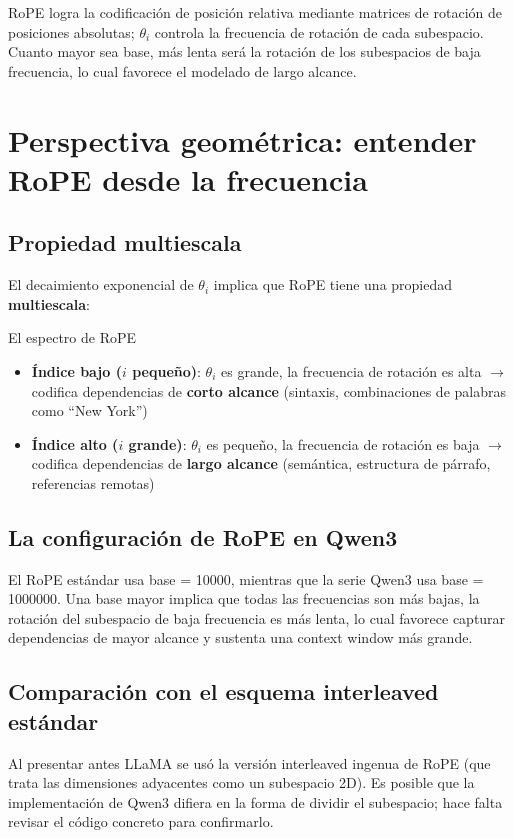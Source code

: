 \documentclass[a4paper]{article}
\begin{document}
RoPE logra la codificación de posición relativa mediante matrices de rotación de posiciones absolutas; $\theta_i$ controla la frecuencia de rotación de cada subespacio. Cuanto mayor sea base, más lenta será la rotación de los subespacios de baja frecuencia, lo cual favorece el modelado de largo alcance.
\section{Perspectiva geométrica: entender RoPE desde la frecuencia}

\subsection{Propiedad multiescala}

El decaimiento exponencial de $\theta_i$ implica que RoPE tiene una propiedad \textbf{multiescala}:

\begin{importantbox}{El espectro de RoPE}
\begin{itemize}
  \item \textbf{Índice bajo ($i$ pequeño)}: $\theta_i$ es grande, la frecuencia de rotación es alta $\to$ codifica dependencias de \textbf{corto alcance} (sintaxis, combinaciones de palabras como ``New York'')
  \item \textbf{Índice alto ($i$ grande)}: $\theta_i$ es pequeño, la frecuencia de rotación es baja $\to$ codifica dependencias de \textbf{largo alcance} (semántica, estructura de párrafo, referencias remotas)
\end{itemize}
\end{importantbox}

\subsection{La configuración de RoPE en Qwen3}

El RoPE estándar usa base = 10000, mientras que la serie Qwen3 usa base = 1000000. Una base mayor implica que todas las frecuencias son más bajas, la rotación del subespacio de baja frecuencia es más lenta, lo cual favorece capturar dependencias de mayor alcance y sustenta una context window más grande.

\subsection{Comparación con el esquema interleaved estándar}

Al presentar antes LLaMA se usó la versión interleaved ingenua de RoPE (que trata las dimensiones adyacentes como un subespacio 2D). Es posible que la implementación de Qwen3 difiera en la forma de dividir el subespacio; hace falta revisar el código concreto para confirmarlo.
\end{document}
